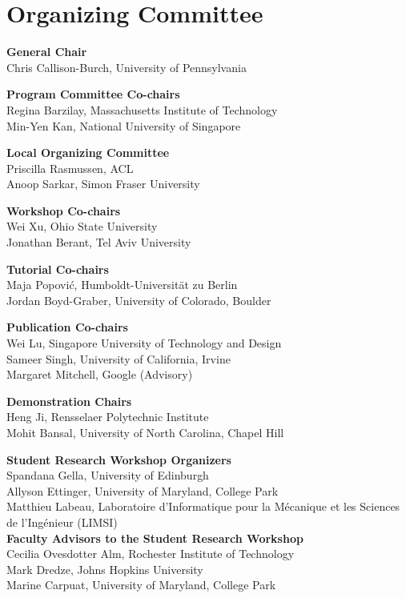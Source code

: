 \markboth{}{} %
\markright{}{} %

\section{Organizing Committee}{}

\setlength{\parindent}{0pt}

{\bf General Chair} \\
Chris Callison-Burch, University of Pennsylvania

{\bf Program Committee Co-chairs} \\
Regina Barzilay, Massachusetts Institute of Technology\\
Min-Yen Kan, National University of Singapore

{\bf Local Organizing Committee} \\
Priscilla Rasmussen, ACL\\
Anoop Sarkar, Simon Fraser University

{\bf Workshop Co-chairs} \\
Wei Xu, Ohio State University \\
Jonathan Berant, Tel Aviv University

{\bf Tutorial Co-chairs} \\
Maja Popovi\'{c}, Humboldt-Universität zu Berlin \\
Jordan Boyd-Graber, University of Colorado, Boulder

{\bf Publication Co-chairs} \\
Wei Lu, Singapore University of Technology and Design \\
Sameer Singh, University of California, Irvine \\
Margaret Mitchell, Google (Advisory)

{\bf Demonstration Chairs} \\
Heng Ji, Rensselaer Polytechnic Institute \\
Mohit Bansal, University of North Carolina, Chapel Hill

{\bf Student Research Workshop Organizers} \\
Spandana Gella, University of Edinburgh \\
Allyson Ettinger, University of Maryland, College Park \\
Matthieu Labeau, Laboratoire d’Informatique pour la Mécanique et les Sciences de l’Ingénieur (LIMSI) \\

{\bf Faculty Advisors to the Student Research Workshop} \\
Cecilia Ovesdotter Alm, Rochester Institute of Technology \\
Mark Dredze, Johns Hopkins University \\
Marine Carpuat, University of Maryland, College Park

